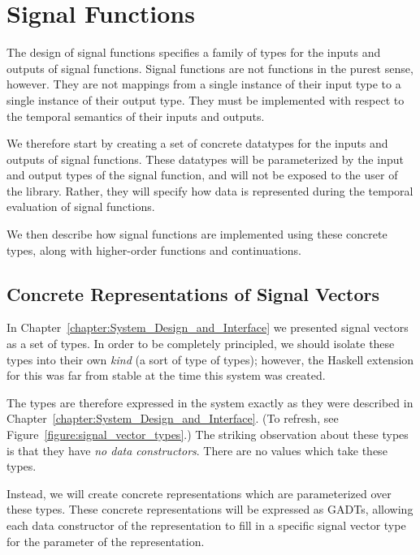 \section{Signal Functions}
\label{section:Implementation-Signal_Functions}

The design of signal functions specifies a family of types for the inputs and
outputs of signal functions. Signal functions are not functions in the purest
sense, however. They are not mappings from a single instance of their input
type to a single instance of their output type. They must be implemented with
respect to the temporal semantics of their inputs and outputs.

We therefore start by creating a set of concrete datatypes for the inputs and
outputs of signal functions. These datatypes will be parameterized by the input
and output types of the signal function, and will not be exposed to the user of
the library. Rather, they will specify how data is represented during the
temporal evaluation of signal functions.

We then describe how signal functions are implemented using these concrete
types, along with higher-order functions and continuations.

\subsection{Concrete Representations of Signal Vectors}
\label{subsection:Concrete_Representations_of_Signal_Vectors}

In Chapter~\ref{chapter:System_Design_and_Interface} we presented signal vectors
as a set of types. In order to be completely principled, we should isolate these
types into their own {\em kind} (a sort of type of types); however, the Haskell
extension for this was far from stable at the time this system was created.

The types are therefore expressed in the system exactly as they were described
in Chapter~\ref{chapter:System_Design_and_Interface}. (To refresh, see
Figure~\ref{figure:signal_vector_types}.) The striking observation about these
types is that they have {\em no data constructors}. There are no values which
take these types.

Instead, we will create concrete representations which are parameterized over
these types. These concrete representations will be expressed as GADTs, allowing
each data constructor of the representation to fill in a specific signal vector
type for the parameter of the representation.

